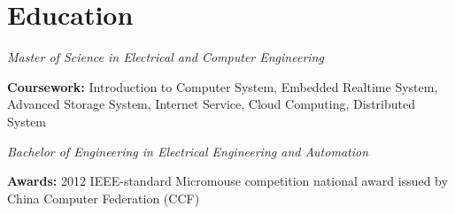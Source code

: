 \documentclass{yijiem}
\begin{document}
\section{Education}
    \begin{spacing}{0.7}
    \textit{\small Master of Science in Electrical and Computer Engineering}\newline
    \end{spacing}
    \textbf{Coursework:} Introduction to Computer System, Embedded Realtime System, Advanced Storage System, Internet Service, Cloud Computing, Distributed System
    \begin{spacing}{0.7}
    \textit{\small Bachelor of Engineering in Electrical Engineering and Automation}\newline
    \end{spacing}
    \textbf{Awards:} 2012 IEEE-standard Micromouse competition national award issued by China Computer Federation (CCF)
\end{document}
